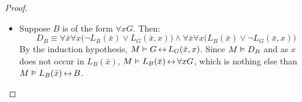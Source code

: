 \begin{proof}
\begin{itemize}
		\item Suppose $B$ is of the form $\forall x G$.
			Then:
			\[
			D_B\equiv \forall \bar x \forall x \big(\lnot L_B(\bar x) \lor L_G(\bar x, x)\big) \land \forall \bar x \forall x \big(L_B(\bar x) \lor \lnot L_G(\bar x, x)\big)\]
			By the induction hypothesis, $M \vDash G \operatorname{\leftrightarrow} L_G(\bar x, x)$.
			Since $M \vDash D_B$ and as $x$ does not occur in $L_B(\bar x)$, $M \vDash L_B(\bar x) \operatorname{\leftrightarrow} \forall x G$,
			which is nothing else than $M \vDash L_B(\bar x) \operatorname{\leftrightarrow} B$.
			\qedhere
	\end{itemize}


\end{proof}


